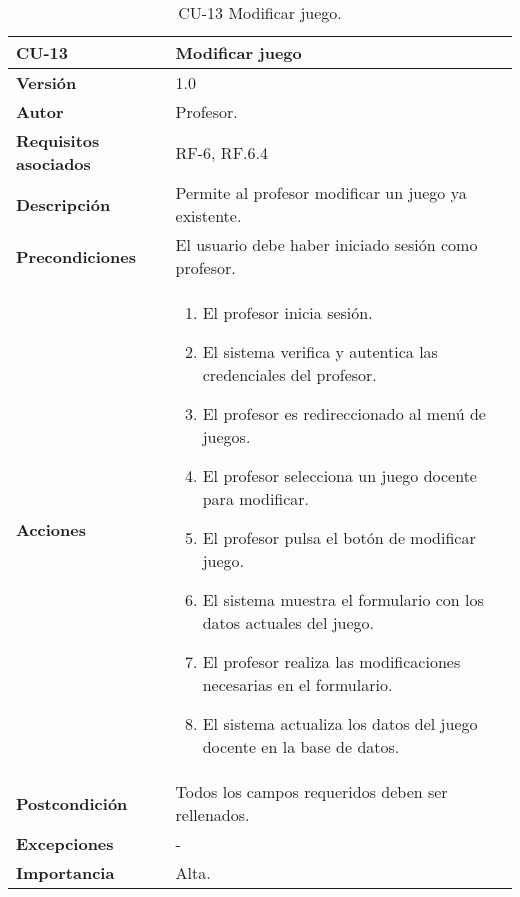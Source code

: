 \begin{table}[h!]
	\centering
	\begin{tabularx}{\linewidth}{ p{} p{} }
		\toprule
		\textbf{CU-13}    & \textbf{Modificar juego}\\
		\toprule
		\textbf{Versión}              & 1.0    \\
		\textbf{Autor}                & Profesor. \\
		\textbf{Requisitos asociados} & RF-6, RF.6.4 \\
		\textbf{Descripción}          & Permite al profesor modificar un juego ya existente.\\
		\textbf{Precondiciones}         & El usuario debe haber iniciado sesión como profesor. \\
		\textbf{Acciones}             &
		\begin{enumerate}
			\def\labelenumi{\arabic{enumi}.}
			\tightlist
			\item El profesor inicia sesión.
            \item El sistema verifica y autentica las credenciales del profesor.
            \item El profesor es redireccionado al menú de juegos.
    	\item El profesor selecciona un juego docente para modificar.
            \item El profesor pulsa el botón de modificar juego.
    	\item El sistema muestra el formulario con los datos actuales del juego.
    	\item El profesor realiza las modificaciones necesarias en el formulario.
            \item El sistema actualiza los datos del juego docente en la base de datos.
		\end{enumerate}\\
         \textbf{Postcondición}             & Todos los campos requeridos deben ser rellenados. \\
		\textbf{Excepciones}             & - \\
		\textbf{Importancia}          & Alta. \\
		\bottomrule
	\end{tabularx}
	\caption{CU-13 Modificar juego.}
\end{table}

